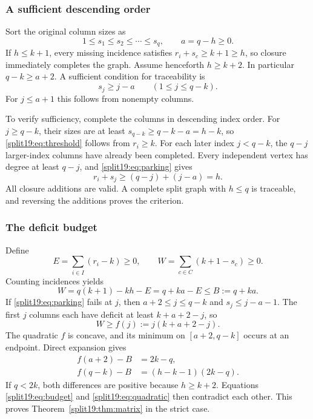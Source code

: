 \documentclass[11pt,a4paper]{article}
\theoremstyle{definition}\newtheorem{definition}[theorem]{Definition}
\theoremstyle{remark}\newtheorem{remark}[theorem]{Remark}
\begin{document}
\subsubsection{A sufficient descending order}
Sort the original column sizes as
\[
 1\le s_1\le s_2\le\cdots\le s_q,
 \qquad a=q-h\ge0.
\]
If $h\le k+1$, every missing incidence satisfies
$r_i+s_c\ge k+1\ge h$, so closure immediately completes the graph.
Assume henceforth $h\ge k+2$. In particular $q-k\ge a+2$.
A sufficient condition for traceability is
\begin{equation}\label{split19:eq:parking}
 s_j\ge j-a\qquad(1\le j\le q-k).
\end{equation}
For $j\le a+1$ this follows from nonempty columns.

To verify sufficiency, complete the columns in descending index order.
For $j\ge q-k$, their sizes are at least
$s_{q-k}\ge q-k-a=h-k$, so \eqref{split19:eq:threshold} follows from $r_i\ge k$.
For each later index $j<q-k$, the $q-j$ larger-index columns have already
been completed. Every independent vertex has degree at least $q-j$,
and \eqref{split19:eq:parking} gives
\[
 r_i+s_j\ge(q-j)+(j-a)=h.
\]
All closure additions are valid. A complete split graph with $h\le q$
is traceable, and reversing the additions proves the criterion.

\subsubsection{The deficit budget}
Define
\[
 E=\sum_{i\in I}(r_i-k)\ge0,
 \qquad W=\sum_{c\in C}(k+1-s_c)\ge0.
\]
Counting incidences yields
\begin{equation}\label{split19:eq:budget}
 W=q(k+1)-kh-E=q+ka-E\le B:=q+ka.
\end{equation}
If \eqref{split19:eq:parking} fails at $j$, then
$a+2\le j\le q-k$ and $s_j\le j-a-1$. The first $j$ columns each have
deficit at least $k+a+2-j$, so
\begin{equation}\label{split19:eq:quadratic}
 W\ge f(j):=j(k+a+2-j).
\end{equation}
The quadratic $f$ is concave, and its minimum on $[a+2,q-k]$ occurs at
an endpoint. Direct expansion gives
\begin{align}
 f(a+2)-B&=2k-q,\label{split19:eq:endpoint-one}\\
 f(q-k)-B&=(h-k-1)(2k-q).\label{split19:eq:endpoint-two}
\end{align}
If $q<2k$, both differences are positive because $h\ge k+2$.
Equations \eqref{split19:eq:budget} and \eqref{split19:eq:quadratic} then contradict each
other. This proves Theorem~\ref{split19:thm:matrix} in the strict case.
\end{document}
